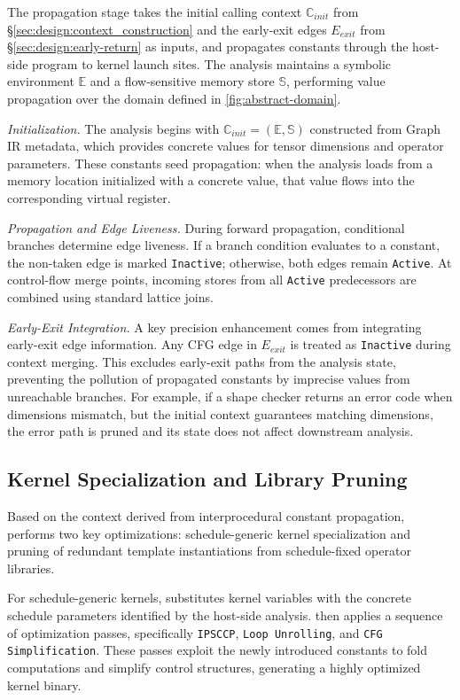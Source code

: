 The propagation stage takes the initial calling context $\mathbb{C}_{init}$ from \S\ref{sec:design:context_construction} and the early-exit edges $E_{exit}$ from \S\ref{sec:design:early-return} as inputs, and propagates constants through the host-side program to kernel launch sites.
The analysis maintains a symbolic environment $\mathbb{E}$ and a flow-sensitive memory store $\mathbb{S}$, performing value propagation over the domain defined in \autoref{fig:abstract-domain}.

\textit{Initialization.}
The analysis begins with $\mathbb{C}_{init}=(\mathbb{E},\mathbb{S})$ constructed from Graph IR metadata, which provides concrete values for tensor dimensions and operator parameters.
These constants seed propagation: when the analysis loads from a memory location initialized with a concrete value, that value flows into the corresponding virtual register.

\textit{Propagation and Edge Liveness.}
During forward propagation, conditional branches determine edge liveness.
If a branch condition evaluates to a constant, the non-taken edge is marked \texttt{Inactive}; otherwise, both edges remain \texttt{Active}.
At control-flow merge points, incoming stores from all \texttt{Active} predecessors are combined using standard lattice joins.

\textit{Early-Exit Integration.}
A key precision enhancement comes from integrating early-exit edge information.
Any CFG edge in $E_{exit}$ is treated as \texttt{Inactive} during context merging.
This excludes early-exit paths from the analysis state, preventing the pollution of propagated constants by imprecise values from unreachable branches.
For example, if a shape checker returns an error code when dimensions mismatch, but the initial context guarantees matching dimensions, the error path is pruned and its state does not affect downstream analysis.


\subsection{Kernel Specialization and Library Pruning} \label{sec:design:specialization}


Based on the context derived from interprocedural constant propagation, \mysys performs two key optimizations: schedule-generic kernel specialization and pruning of redundant template instantiations from schedule-fixed operator libraries.

For schedule-generic kernels, \mysys substitutes kernel variables with the concrete schedule parameters identified by the host-side analysis.
\mysys then applies a sequence of optimization passes, specifically \texttt{IPSCCP}, \texttt{Loop Unrolling}, and \texttt{CFG Simplification}.
These passes exploit the newly introduced constants to fold computations and simplify control structures, generating a highly optimized kernel binary.

